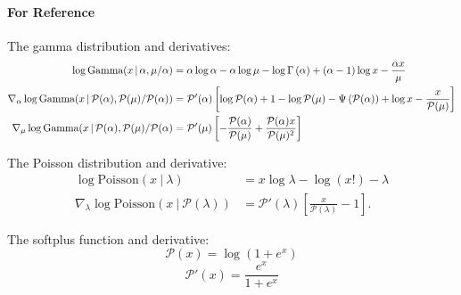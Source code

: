 \paragraph{For Reference}
The gamma distribution and derivatives:
\begin{align}
\log\mbox{Gamma}(x \, | \, \alpha, \mu/\alpha) & = \alpha\log\alpha - \alpha\log\mu - \log\Gamma \left(\alpha\right) + (\alpha-1)\log x - \frac{\alpha x}{\mu} \label{eq:gamma}\\
\nabla_\alpha \log\mbox{Gamma}(x \, | \, \mathcal{P}(\alpha), \mathcal{P}(\mu)/\mathcal{P}(\alpha)) &= 
\mathcal{P}'(\alpha) \left[\log\mathcal{P}(\alpha) + 1 - \log\mathcal{P}(\mu) - \Psi \left(\mathcal{P}(\alpha)\right) + \log x - \frac{x}{\mathcal{P}(\mu)}\right] \label{eq:dgammaA}
\\
\nabla_\mu \log\mbox{Gamma}(x \, | \, \mathcal{P}(\alpha), \mathcal{P}(\mu)/\mathcal{P}(\alpha) &= 
\mathcal{P}'(\mu) \left[ -\frac{\mathcal{P}(\alpha)}{\mathcal{P}(\mu)} + \frac{\mathcal{P}(\alpha)x}{\mathcal{P}(\mu)^2}\right]\label{eq:dgammaB}
\end{align}

The Poisson distribution and derivative:
\begin{align}
\log\mbox{Poisson}(x~\vert~\lambda) &= x\log\lambda - \log(x!) - \lambda \label{eq:poisson} \\
\nabla_\lambda \log\mbox{Poisson}(x~\vert~\mathcal{P}(\lambda)) &= \mathcal{P}'(\lambda)\left[\frac{x}{\mathcal{P}(\lambda)} -1\right].\label{eq:dpoisson}
\end{align}

The softplus function and derivative:
\[\mathcal{P}(x) = \log(1+e^x)\]
\[\mathcal{P}'(x) = \frac{e^x}{1+e^x}\]


